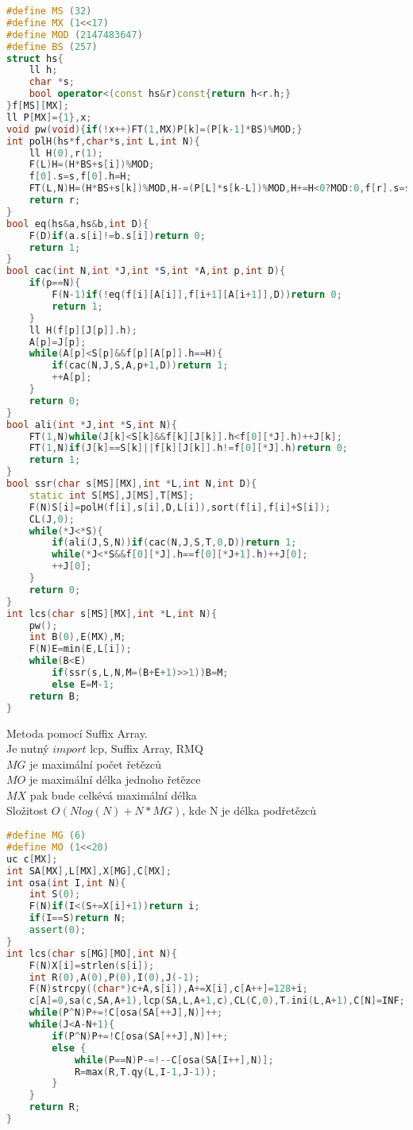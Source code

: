 \documentclass[11pt]{article}
\begin{document}
\begin{lstlisting}[language=C++]
#define MS (32)
#define MX (1<<17)
#define MOD (2147483647)
#define BS (257)
struct hs{
    ll h;
    char *s;
    bool operator<(const hs&r)const{return h<r.h;}
}f[MS][MX];
ll P[MX]={1},x;
void pw(void){if(!x++)FT(1,MX)P[k]=(P[k-1]*BS)%MOD;}
int polH(hs*f,char*s,int L,int N){
    ll H(0),r(1);
    F(L)H=(H*BS+s[i])%MOD;
    f[0].s=s,f[0].h=H;
    FT(L,N)H=(H*BS+s[k])%MOD,H-=(P[L]*s[k-L])%MOD,H+=H<0?MOD:0,f[r].s=s+r,f[r++].h=H; 
    return r;
}
bool eq(hs&a,hs&b,int D){
    F(D)if(a.s[i]!=b.s[i])return 0;
    return 1;
}
bool cac(int N,int *J,int *S,int *A,int p,int D){
    if(p==N){
        F(N-1)if(!eq(f[i][A[i]],f[i+1][A[i+1]],D))return 0;
        return 1;
    }
    ll H(f[p][J[p]].h);
    A[p]=J[p];
    while(A[p]<S[p]&&f[p][A[p]].h==H){
        if(cac(N,J,S,A,p+1,D))return 1;
        ++A[p];
    }
    return 0;
}
bool ali(int *J,int *S,int N){
    FT(1,N)while(J[k]<S[k]&&f[k][J[k]].h<f[0][*J].h)++J[k];
    FT(1,N)if(J[k]==S[k]||f[k][J[k]].h!=f[0][*J].h)return 0;
    return 1;
}
bool ssr(char s[MS][MX],int *L,int N,int D){
    static int S[MS],J[MS],T[MS];
    F(N)S[i]=polH(f[i],s[i],D,L[i]),sort(f[i],f[i]+S[i]);
    CL(J,0);
    while(*J<*S){
        if(ali(J,S,N))if(cac(N,J,S,T,0,D))return 1;
        while(*J<*S&&f[0][*J].h==f[0][*J+1].h)++J[0];
        ++J[0];
    }
    return 0;
}
int lcs(char s[MS][MX],int *L,int N){
    pw();
    int B(0),E(MX),M;
    F(N)E=min(E,L[i]);
    while(B<E)
        if(ssr(s,L,N,M=(B+E+1)>>1))B=M;
        else E=M-1;
    return B;
}
\end{lstlisting}
Metoda pomocí Suffix Array.
\\Je nutný $import$ lcp, Suffix Array, RMQ
\\$MG$ je maximální počet řetězců
\\$MO$ je maximální délka jednoho řetězce
\\$MX$ pak bude celkévá maximální délka
\\Složitost $O(Nlog(N)+N*MG)$, kde N je délka podřetězců
\begin{lstlisting}[language=C++]
#define MG (6)
#define MO (1<<20)
uc c[MX];
int SA[MX],L[MX],X[MG],C[MX];
int osa(int I,int N){
    int S(0);
    F(N)if(I<(S+=X[i]+1))return i;
    if(I==S)return N;
    assert(0);
}
int lcs(char s[MG][MO],int N){
    F(N)X[i]=strlen(s[i]);
    int R(0),A(0),P(0),I(0),J(-1);
    F(N)strcpy((char*)c+A,s[i]),A+=X[i],c[A++]=128+i;
    c[A]=0,sa(c,SA,A+1),lcp(SA,L,A+1,c),CL(C,0),T.ini(L,A+1),C[N]=INF;
    while(P^N)P+=!C[osa(SA[++J],N)]++;
    while(J<A-N+1){
        if(P^N)P+=!C[osa(SA[++J],N)]++;
        else {
            while(P==N)P-=!--C[osa(SA[I++],N)];
            R=max(R,T.qy(L,I-1,J-1));
        }
    }
    return R;
}
\end{lstlisting}
\end{document}
